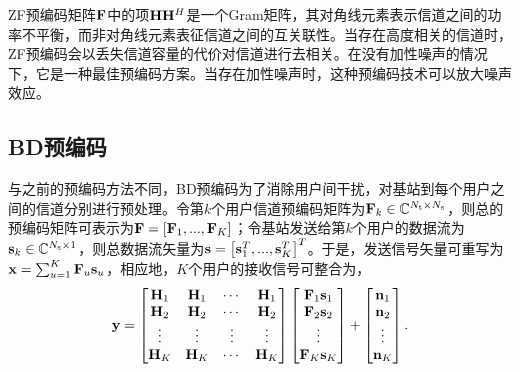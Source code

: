 ZF预编码矩阵${\bf{F}}$中的项${{{\bf{H}}{{\bf{H}}^H}}}$是一个Gram矩阵，其对角线元素表示信道之间的功率不平衡，而非对角线元素表征信道之间的互关联性。当存在高度相关的信道时，ZF预编码会以丢失信道容量的代价对信道进行去相关。在没有加性噪声的情况下，它是一种最佳预编码方案。当存在加性噪声时，这种预编码技术可以放大噪声效应。

\subsection{BD预编码}
与之前的预编码方法不同，BD预编码为了消除用户间干扰，对基站到每个用户之间的信道分别进行预处理。令第${k}$个用户信道预编码矩阵为${{{\bf{F}}_k} \in {\mathbb{C}^{{N_{\rm{t}}} \times {N_{\rm{s}}}}}}$，则总的预编码矩阵可表示为${{\bf{F}} = \left[ {{{\bf{F}}_1},...,{{\bf{F}}_K}} \right]}$；令基站发送给第${k}$个用户的数据流为${{\bf{s}}_k} \in {\mathbb{C}^{{N_{\rm{s}}} \times 1}}$，则总数据流矢量为${\bf{s}} = {\left[ {{\bf{s}}_1^T,...,{\bf{s}}_K^T} \right]^T}$。于是，发送信号矢量可重写为${{\bf{x}} = \sum\nolimits_{u = 1}^K {{{\bf{F}}_u}{{\bf{s}}_u}}}$，相应地，${K}$个用户的接收信号可整合为，
\begin{equation}\label{chap2:eq32}
  {\bf{y}} = \begin{bmatrix}
               {{{\bf{H}}_1}} & {{{\bf{H}}_1}} & \cdots & {{{\bf{H}}_1}} \\
               {{{\bf{H}}_2}} & {{{\bf{H}}_2}} & \cdots & {{{\bf{H}}_2}} \\
               \vdots & \vdots & \vdots & \vdots \\
               {{{\bf{H}}_K}} & {{{\bf{H}}_K}} & \cdots & {{{\bf{H}}_K}}
             \end{bmatrix}
             \begin{bmatrix}
               {{{\bf{F}}_{\rm{1}}}{{\bf{s}}_{\rm{1}}}} \\
               {{{\bf{F}}_{\rm{2}}}{{\bf{s}}_{\rm{2}}}} \\
               \vdots \\
               {{{\bf{F}}_K}{{\bf{s}}_K}}
             \end{bmatrix} +
             \begin{bmatrix}
               {{{\bf{n}}_1}} \\
               {{{\bf{n}}_2}} \\
               \vdots \\
               {{{\bf{n}}_K}}
             \end{bmatrix}.
\end{equation}

